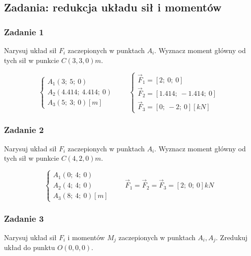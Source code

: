 \subsection*{Zadania: redukcja układu sił i momentów}

\subsubsection*{Zadanie 1}

Narysuj układ sił $F_i$ zaczepionych w punktach $A_i$. Wyznacz moment główny od tych sił w punkcie $C(3,3,0)\si{m}$.

\begin{equation*}
    \begin{cases}
        A_1(3;\ 5;\ 0) \\
        A_2(4.414;\ 4.414;\ 0) \\
        A_3(5;\ 3;\ 0) [ \si{m} ]
    \end{cases}
    \qquad
    \begin{cases}
        \Vec{F}_1 = [2;\ 0;\ 0 ] \\
        \Vec{F}_2 = [1.414;\ -1.414;\ 0 ] \\
        \Vec{F}_3 = [0;\ -2;\ 0 ] [ \si{kN} ]
    \end{cases}
\end{equation*}

\subsubsection*{Zadanie 2}

Narysuj układ sił $F_i$ zaczepionych w punktach $A_i$. Wyznacz moment główny od tych sił w punkcie $C(4,2,0)\si{m}$.

\begin{equation*}
    \begin{cases}
        A_1(0;\ 4;\ 0) \\
        A_2(4;\ 4;\ 0) \\
        A_3(8;\ 4;\ 0) [ \si{m} ]
    \end{cases}
    \qquad
    \Vec{F}_1 = \Vec{F}_2 = \Vec{F}_3 = [2;\ 0;\ 0] \si{kN}
\end{equation*}

\subsubsection*{Zadanie 3}

Narysuj układ sił $F_i$ i momentów $M_j$ zaczepionych w punktach $A_i,A_j$. Zredukuj układ do punktu $O(0,0,0)$.

